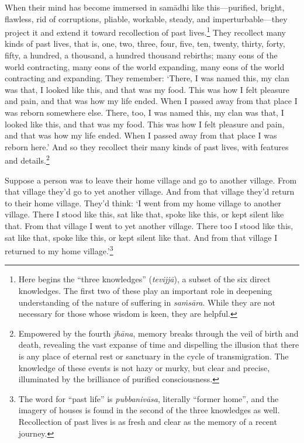 \documentclass[12pt,openany]{book}%
\begin{document}
When their mind has become immersed in \textsanskrit{samādhi} like this—purified, bright, flawless, rid of corruptions, pliable, workable, steady, and imperturbable—they project it and extend it toward recollection of past lives.\footnote{Here begins the “three knowledges” (\textit{\textsanskrit{tevijjā}}), a subset of the six direct knowledges. The first two of these play an important role in deepening understanding of the nature of suffering in \textit{\textsanskrit{saṁsāra}}. While they are not necessary for those whose wisdom is keen, they are helpful. } They recollect many kinds of past lives, that is, one, two, three, four, five, ten, twenty, thirty, forty, fifty, a hundred, a thousand, a hundred thousand rebirths; many eons of the world contracting, many eons of the world expanding, many eons of the world contracting and expanding. They remember: ‘There, I was named this, my clan was that, I looked like this, and that was my food. This was how I felt pleasure and pain, and that was how my life ended. When I passed away from that place I was reborn somewhere else. There, too, I was named this, my clan was that, I looked like this, and that was my food. This was how I felt pleasure and pain, and that was how my life ended. When I passed away from that place I was reborn here.’ And so they recollect their many kinds of past lives, with features and details.\footnote{Empowered by the fourth \textit{\textsanskrit{jhāna}}, memory breaks through the veil of birth and death, revealing the vast expanse of time and dispelling the illusion that there is any place of eternal rest or sanctuary in the cycle of transmigration. The knowledge of these events is not hazy or murky, but clear and precise, illuminated by the brilliance of purified consciousness. } 

Suppose a person was to leave their home village and go to another village. From that village they’d go to yet another village. And from that village they’d return to their home village. They’d think: ‘I went from my home village to another village. There I stood like this, sat like that, spoke like this, or kept silent like that. From that village I went to yet another village. There too I stood like this, sat like that, spoke like this, or kept silent like that. And from that village I returned to my home village.’\footnote{The word for “past life” is \textit{\textsanskrit{pubbanivāsa}}, literally “former home”, and the imagery of houses is found in the second of the three knowledges as well. Recollection of past lives is as fresh and clear as the memory of a recent journey. } 
\end{document}
